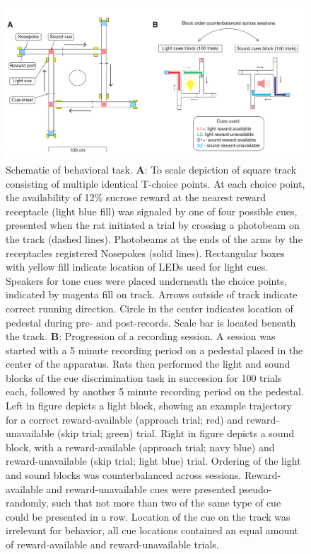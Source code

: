 \documentclass[11pt]{article}
\newcommand{\bsf}[1]{\textbf{#1}}
\begin{document}
 \begin{figure}[ht!]
\centering
\includegraphics[width=\textwidth]{Fig 2 - Schematic task.pdf}
\caption{Schematic of behavioral task. \bsf{A}: To scale depiction of square
track consisting of multiple identical T-choice points. At each choice point,
the availability of 12\% sucrose reward at the nearest reward receptacle (light
blue fill) was signaled by one of four possible cues, presented when the rat
initiated a trial by crossing a photobeam on the track (dashed
lines). Photobeams at the ends of the arms by the receptacles registered
Nosepokes (solid lines). Rectangular boxes with yellow fill indicate location of LEDs used
for light cues. Speakers for tone cues were placed underneath the choice
points, indicated by magenta fill on track. Arrows outside of track indicate correct running direction. Circle in the center indicates location of pedestal during pre- and post-records. Scale bar is located beneath the track. \bsf{B}: Progression of
a recording session. A session was started with a 5 minute recording period on
a pedestal placed in the center of the apparatus. Rats then performed the light and sound blocks of the cue discrimination task in succession for 100 trials each, followed by another 5 minute recording period on the pedestal. Left in figure depicts a light block, showing an
example trajectory for a correct reward-available (approach trial; red) and reward-unavailable
(skip trial; green) trial. Right in figure depicts a sound block, with a reward-available
(approach trial; navy blue) and reward-unavailable (skip trial; light blue) trial. Ordering of the light and sound blocks was counterbalanced across sessions. Reward-available and reward-unavailable cues were presented pseudo-randomly, such that not more than two of the same type of cue could be presented in a row. Location of the cue on the track was irrelevant for
behavior, all cue locations contained an equal amount of reward-available and
reward-unavailable trials.
}
\label{fig:task}
\end{figure} \clearpage
\end{document}
